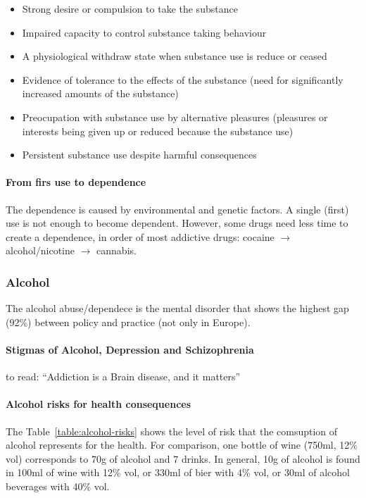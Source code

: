 \documentclass[12pt,article,oneside,a4paper]{memoir}
\begin{document}
\begin{itemize}
\item Strong desire or compulsion to take the substance
\item Impaired capacity to control substance taking behaviour
\item A physiological withdraw state when substance use is reduce or ceased
\item Evidence of tolerance to the effects of the substance (need for significantly increased amounts of the substance)
\item Preocupation with substance use by alternative pleasures (pleasures or interests being given up or reduced because the substance use)
\item Persistent substance use despite harmful consequences
\end{itemize}

\paragraph{From firs use to dependence} 
The dependence is caused by environmental and genetic factors. A single (first) use is not enough to become dependent.
However, some drugs need less time to create a dependence, in order of most addictive drugs: cocaine $\rightarrow$ alcohol/nicotine $\rightarrow$ cannabis.

\subsubsection{Alcohol}

The alcohol abuse/dependece is the mental disorder that shows the highest gap (92\%) between policy and practice (not only in Europe).

\paragraph{Stigmas of Alcohol, Depression and Schizophrenia}
 to read: ``Addiction is a Brain disease, and it matters''

\paragraph{Alcohol risks for health consequences} 

The Table~\ref{table:alcohol-risks} shows the level of risk that the comsuption of alcohol represents for the health. For comparison, one bottle of wine (750ml, 12\% vol) corresponds to 70g of alcohol and 7 drinks. In general, 10g of alcohol is found in 100ml of wine with 12\% vol, or 330ml of bier with 4\% vol, or 30ml of alcohol beverages with 40\% vol.
\end{document}
